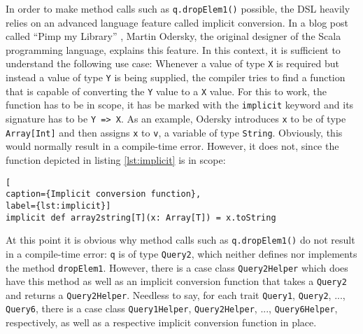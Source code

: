 \documentclass[article, type=bsc, colorback, accentcolor=tud8b, parskip=half, bibliography=totocnumbered]{tudthesis}
\begin{document}
In order to make method calls such as \lstinline{q.dropElem1()} possible, the DSL heavily relies on an advanced language feature called implicit conversion.
In a blog post called ``Pimp my Library'' \cite{pimp}, Martin Odersky, the original designer of the Scala programming language, explains this feature.
In this context, it is sufficient to understand the following use case: Whenever a value of type \lstinline{X} is required but instead a value of type \lstinline{Y} is being supplied, the compiler tries to find a function that is capable of converting the \lstinline{Y} value to a \lstinline{X} value.
For this to work, the function has to be in scope, it has be marked with the \lstinline{implicit} keyword and its signature has to be \lstinline{Y => X}.
As an example, Odersky introduces \lstinline{x} to be of type \lstinline{Array[Int]} and then assigns \lstinline{x} to \lstinline{v}, a variable of type \lstinline{String}.
Obviously, this would normally result in a compile-time error.
However, it does not, since the function depicted in listing \ref{lst:implicit} is in scope:

\begin{lstlisting}[
caption={Implicit conversion function},
label={lst:implicit}]
implicit def array2string[T](x: Array[T]) = x.toString
\end{lstlisting}

At this point it is obvious why method calls such as \lstinline{q.dropElem1()} do not result in a compile-time error:
\lstinline{q} is of type \lstinline{Query2}, which neither defines nor implements the method \lstinline{dropElem1}.
However, there is a case class \lstinline{Query2Helper} which does have this method as well as an implicit conversion function that takes a \lstinline{Query2} and returns a \lstinline{Query2Helper}.
Needless to say, for each trait \lstinline{Query1}, \lstinline{Query2}, ..., \lstinline{Query6}, there is a case class \lstinline{Query1Helper}, \lstinline{Query2Helper}, ..., \lstinline{Query6Helper}, respectively, as well as a respective implicit conversion function in place.
\end{document}
